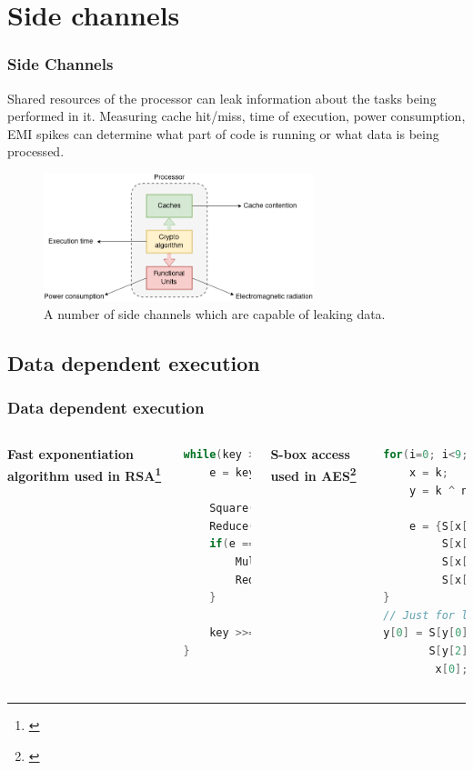 \documentclass[10pt,usenames,dvipsnames]{beamer}
\begin{document}
\section{Side channels}

\begin{frame}
\frametitle{Side Channels}

Shared resources of the processor can leak information about the tasks being performed in it.
Measuring cache hit/miss, time of execution, power consumption, EMI spikes can
determine what part of code is running or what data is being processed.

\begin{figure}[h]
    \centering
    \includegraphics[width=0.7\textwidth]{side_channel}
    \caption[Data leakage sources]{A number of side channels which are capable of leaking data.}
\end{figure}
\end{frame}

\subsection{Data dependent execution}
\begin{frame}[fragile]
\frametitle{Data dependent execution}

\begin{columns}[t]
        \textbf{Fast exponentiation algorithm used in RSA\footnote[frame]{\cite{cache_missing}}}
        \begin{lstlisting}[language={C}]
while(key > 0) {
    e = key % 2;

    Square();
    Reduce();
    if(e == 1) {
        Multiply();
        Reduce();
    }

    key >>= 1;
}
        \end{lstlisting}
        \textbf{S-box access used in AES\footnote[frame]{\cite{bern}}}
        \begin{lstlisting}[language={C}]
for(i=0; i<9; i++) {
    x = k;
    y = k ^ n;

    e = {S[x[1]]^1,
         S[x[2]],
         S[x[3]],
         S[x[0]]};
}
// Just for last round
y[0] = S[y[0]]^S[y[1]]^
       S[y[2]]^S[y[3]]^
        x[0];
        \end{lstlisting}
\end{columns}
\end{frame}
\end{document}
